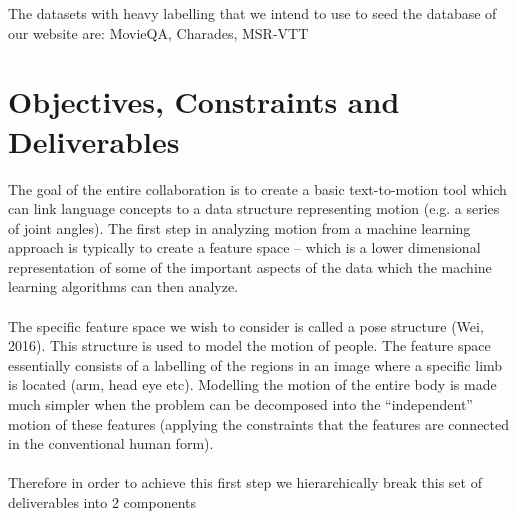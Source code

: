 \documentclass[a4paper, 12pt]{article}
\begin{document}
The datasets with heavy labelling that we intend to use to seed the database of
our website are: MovieQA, Charades, MSR-VTT

\section{Objectives, Constraints and Deliverables}

The goal of the entire collaboration is to create a basic text-to-motion tool
which can link language concepts to a data structure representing motion (e.g. a
series of joint angles). The first step in analyzing motion from a machine
learning approach is typically to create a feature space -- which is a lower
dimensional representation of some of the important aspects of the data which
the machine learning algorithms can then analyze. \\ \\ The specific feature
space we wish to consider is called a pose structure (Wei, 2016). This structure
is used to model the motion of people. The feature space essentially consists of
a labelling of the regions in an image where a specific limb is located (arm,
head eye etc). Modelling the motion of the entire body is made much simpler when
the problem can be decomposed into the “independent” motion of these features
(applying the constraints that the features are connected in the conventional
human form). \\ \\ Therefore in order to achieve this first step we
hierarchically break this set of deliverables into 2 components
\end{document}
